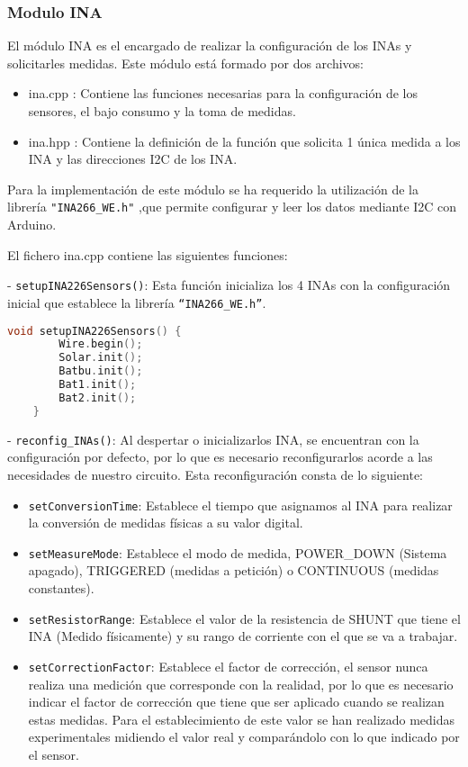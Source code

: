 \subsubsection{Modulo INA}

El módulo INA es el encargado de realizar la configuración de los INAs y solicitarles medidas.
Este módulo está formado por dos archivos:
\begin{itemize}
    \item ina.cpp : Contiene las funciones necesarias para la configuración de los sensores, el bajo consumo y la toma de medidas.
    \item ina.hpp : Contiene la definición de la función que solicita 1 única medida a los INA y las direcciones I2C de los INA.
\end{itemize}

Para la implementación de este módulo se ha requerido la utilización de la librería \texttt{"INA266\_WE.h"} ,que permite configurar y leer los datos mediante I2C con Arduino.

El fichero ina.cpp contiene las siguientes funciones:

- \texttt{setupINA226Sensors()}: Esta función inicializa los 4 INAs con la configuración inicial que establece la librería \texttt{“INA266\_WE.h”}.

\begin{lstlisting}[captionpos=b, caption={Codigo funcion setupINA226Sensors}, language=c++]
    void setupINA226Sensors() {
        Wire.begin();
        Solar.init();
        Batbu.init();
        Bat1.init();
        Bat2.init();
    }
\end{lstlisting}

- \texttt{reconfig\_INAs()}: Al despertar o inicializarlos INA, se encuentran con la configuración por defecto, por lo que es necesario reconfigurarlos acorde a las necesidades de nuestro circuito. Esta reconfiguración consta de lo siguiente:
\begin{itemize}
    \item \texttt{setConversionTime}: Establece el tiempo que asignamos al INA para realizar la conversión de medidas físicas a su valor digital.
    \item \texttt{setMeasureMode}: Establece el modo de medida, POWER\_DOWN (Sistema apagado), TRIGGERED (medidas a petición) o CONTINUOUS (medidas constantes).
    \item \texttt{setResistorRange}: Establece el valor de la resistencia de SHUNT que tiene el INA (Medido físicamente) y su rango de corriente con el que se va a trabajar.
    \item \texttt{setCorrectionFactor}: Establece el factor de corrección, el sensor nunca realiza una medición que corresponde con la realidad, por lo que es necesario indicar el factor de corrección que tiene que ser aplicado cuando se realizan estas medidas. Para el establecimiento de este valor se han realizado medidas experimentales midiendo el valor real y comparándolo con lo que indicado por el sensor.
\end{itemize}



